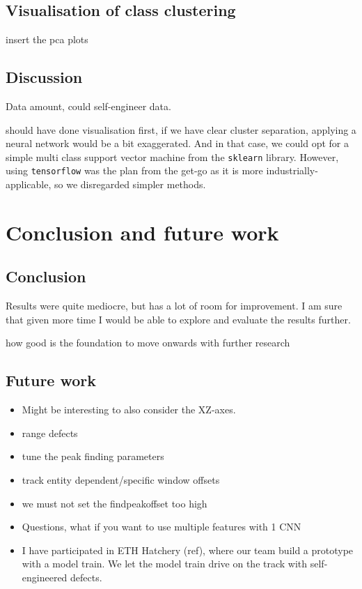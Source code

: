 \section{Visualisation of class clustering}
insert the pca plots

\section{Discussion}
Data amount, could self-engineer data. 

should have done visualisation first, if we have clear cluster separation, applying a neural network would be a bit exaggerated. And in that case, we could opt for a simple multi class support vector machine from the \verb|sklearn| library. However, using \verb|tensorflow| was the plan from the get-go as it is more industrially-applicable, so we disregarded simpler methods.





\chapter{Conclusion and future work}

\section{Conclusion}
Results were quite mediocre, but has a lot of room for improvement. I am sure that given more time I would be able to explore and evaluate the results further.

how good is the foundation to move onwards with further research
\section{Future work}

\begin{itemize}
	\item Might be interesting to also consider the XZ-axes.
	\item range defects
	\item tune the peak finding parameters
	\item track entity dependent/specific window offsets
	\item we must not set the findpeakoffset too high
	\item Questions, what if you want to use multiple features with 1 CNN
	\item I have participated in ETH Hatchery (ref), where our team build a prototype with a model train. We let the model train drive on the track with self-engineered defects.

\end{itemize}

